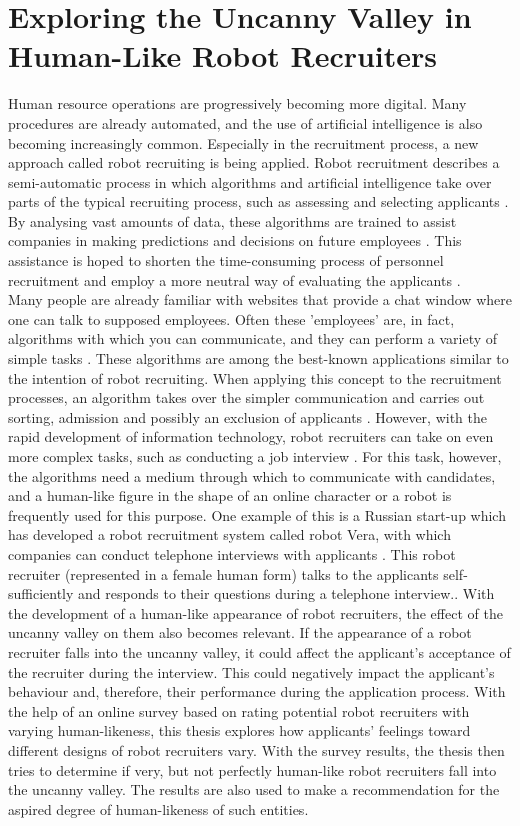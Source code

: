 \chapter{Exploring the Uncanny Valley in Human-Like Robot Recruiters}
\label{chap:6}
Human resource operations are progressively becoming more digital. Many procedures are already automated, and the use of artificial intelligence is also becoming increasingly common. Especially in the recruitment process, a new approach called robot recruiting is being applied. Robot recruitment describes a semi-automatic process in which algorithms and artificial intelligence take over parts of the typical recruiting process, such as assessing and selecting applicants \cite{vera}. By analysing vast amounts of data, these algorithms are trained to assist companies in making predictions and decisions on future employees \cite{robot_recruiting_scholar}. This assistance is hoped to shorten the time-consuming process of personnel recruitment and employ a more neutral way of evaluating the applicants \cite{robot_recruiting_scholar}.\\
Many people are already familiar with websites that provide a chat window where one can talk to supposed employees. Often these 'employees' are, in fact, algorithms with which you can communicate, and they can perform a variety of simple tasks \cite{vera}. These algorithms are among the best-known applications similar to the intention of robot recruiting. When applying this concept to the recruitment processes, an algorithm takes over the simpler communication and carries out sorting, admission and possibly an exclusion of applicants \cite{vera}. However, with the rapid development of information technology, robot recruiters can take on even more complex tasks, such as conducting a job interview \cite{vera}. For this task, however, the algorithms need a medium through which to communicate with candidates, and a human-like figure in the shape of an online character or a robot is frequently used for this purpose. One example of this is a Russian start-up which has developed a robot recruitment system called robot Vera, with which companies can conduct telephone interviews with applicants \cite{vera}.
This robot recruiter (represented in a female human form) talks to the applicants self-sufficiently and responds to their questions during a telephone interview.\cite{vera}. With the development of a human-like appearance of robot recruiters, the effect of the uncanny valley on them also becomes relevant. If the appearance of a robot recruiter falls into the uncanny valley, it could affect the applicant's acceptance of the recruiter during the interview. This could negatively impact the applicant's behaviour and, therefore, their performance during the application process.
With the help of an online survey based on rating potential robot recruiters with varying human-likeness, this thesis explores how applicants' feelings toward different designs of robot recruiters vary. With the survey results, the thesis then tries to determine if very, but not perfectly human-like robot recruiters fall into the uncanny valley. The results are also used to make a recommendation for the aspired degree of human-likeness of such entities. 

